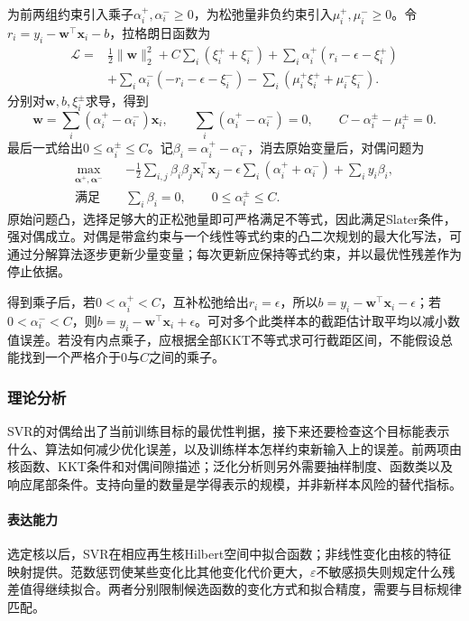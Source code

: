 为前两组约束引入乘子$\alpha_i^+,\alpha_i^-\geq0$，为松弛量非负约束引入$\mu_i^+,\mu_i^-\geq0$。令$r_i=y_i-\bm{w}^{\top}\bm{x}_i-b$，拉格朗日函数为
\[
  \begin{aligned}
    \mathcal{L}={}&\tfrac12\lVert\bm{w}\rVert_2^2
       +C\sum_i(\xi_i^++\xi_i^-)
       +\sum_i\alpha_i^+(r_i-\epsilon-\xi_i^+)\\
       &+\sum_i\alpha_i^-(-r_i-\epsilon-\xi_i^-)
       -\sum_i(\mu_i^+\xi_i^++\mu_i^-\xi_i^-).
  \end{aligned}
\]
分别对$\bm{w},b,\xi_i^\pm$求导，得到
\[
  \bm{w}=\sum_i(\alpha_i^+-\alpha_i^-)\bm{x}_i,\qquad
  \sum_i(\alpha_i^+-\alpha_i^-)=0,\qquad
  C-\alpha_i^\pm-\mu_i^\pm=0.
\]
最后一式给出$0\leq\alpha_i^\pm\leq C$。记$\beta_i=\alpha_i^+-\alpha_i^-$，消去原始变量后，对偶问题为
\begin{equation}
  \begin{aligned}
    \max_{\bm{\alpha}^+,\bm{\alpha}^-}\quad&
       -\tfrac12\sum_{i,j}\beta_i\beta_j\bm{x}_i^{\top}\bm{x}_j
       -\epsilon\sum_i(\alpha_i^++\alpha_i^-)
       +\sum_i y_i\beta_i,\\
    \text{满足}\quad&
       \sum_i\beta_i=0,\qquad 0\leq\alpha_i^\pm\leq C.
  \end{aligned}
  \label{eq:regression-svr-dual}
\end{equation}
原始问题凸，选择足够大的正松弛量即可严格满足不等式，因此满足Slater条件，强对偶成立。对偶是带盒约束与一个线性等式约束的凸二次规划的最大化写法，可通过分解算法逐步更新少量变量；每次更新应保持等式约束，并以最优性残差作为停止依据。

得到乘子后，若$0<\alpha_i^+<C$，互补松弛给出$r_i=\epsilon$，所以$b=y_i-\bm{w}^{\top}\bm{x}_i-\epsilon$；若$0<\alpha_i^-<C$，则$b=y_i-\bm{w}^{\top}\bm{x}_i+\epsilon$。可对多个此类样本的截距估计取平均以减小数值误差。若没有内点乘子，应根据全部KKT不等式求可行截距区间，不能假设总能找到一个严格介于$0$与$C$之间的乘子。

\subsubsection{理论分析}

SVR的对偶给出了当前训练目标的最优性判据，接下来还要检查这个目标能表示什么、算法如何减少优化误差，以及训练样本怎样约束新输入上的误差。前两项由核函数、KKT条件和对偶间隙描述；泛化分析则另外需要抽样制度、函数类以及响应尾部条件。支持向量的数量是学得表示的规模，并非新样本风险的替代指标。

\paragraph{表达能力}
选定核以后，SVR在相应再生核Hilbert空间中拟合函数；非线性变化由核的特征映射提供。范数惩罚使某些变化比其他变化代价更大，$\varepsilon$不敏感损失则规定什么残差值得继续拟合。两者分别限制候选函数的变化方式和拟合精度，需要与目标规律匹配。

